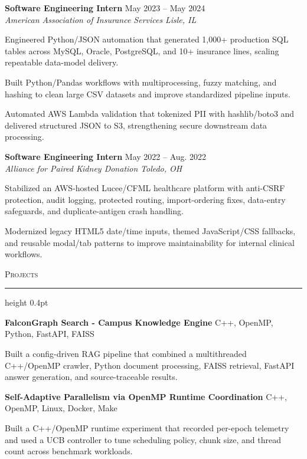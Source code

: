 \documentclass[letterpaper,11pt]{article}
\newcommand{\resumesection}[1]{%
  \par\vspace{2pt}%
  {\large\scshape #1}\par\vspace{2pt}%
  \hrule height 0.4pt\vspace{2pt}%
}
\newcommand{\resumeSubheading}[4]{
  \textbf{#1} \hfill #2\\
  \textit{#3} \hfill \textit{#4}
}
\newcommand{\projectHeading}[2]{
  \textbf{#1} \hfill #2
}
\begin{document}
\resumeSubheading
{Software Engineering Intern}{May 2023 -- May 2024}
{American Association of Insurance Services}{Lisle, IL}
\begin{tightitemize}
  \item Engineered Python/JSON automation that generated 1,000+ production SQL tables across MySQL, Oracle, PostgreSQL, and 10+ insurance lines, scaling repeatable data-model delivery.
  \item Built Python/Pandas workflows with multiprocessing, fuzzy matching, and hashing to clean large CSV datasets and improve standardized pipeline inputs.
  \item Automated AWS Lambda validation that tokenized PII with hashlib/boto3 and delivered structured JSON to S3, strengthening secure downstream data processing.
\end{tightitemize}

\resumeSubheading
{Software Engineering Intern}{May 2022 -- Aug. 2022}
{Alliance for Paired Kidney Donation}{Toledo, OH}
\begin{tightitemize}
  \item Stabilized an AWS-hosted Lucee/CFML healthcare platform with anti-CSRF protection, audit logging, protected routing, import-ordering fixes, data-entry safeguards, and duplicate-antigen crash handling.
  \item Modernized legacy HTML5 date/time inputs, themed JavaScript/CSS fallbacks, and reusable modal/tab patterns to improve maintainability for internal clinical workflows.
\end{tightitemize}

\resumesection{Projects}
\projectHeading{FalconGraph Search - Campus Knowledge Engine}{C++, OpenMP, Python, FastAPI, FAISS}
\begin{tightitemize}
  \item Built a config-driven RAG pipeline that combined a multithreaded C++/OpenMP crawler, Python document processing, FAISS retrieval, FastAPI answer generation, and source-traceable results.
\end{tightitemize}

\projectHeading{Self-Adaptive Parallelism via OpenMP Runtime Coordination}{C++, OpenMP, Linux, Docker, Make}
\begin{tightitemize}
  \item Built a C++/OpenMP runtime experiment that recorded per-epoch telemetry and used a UCB controller to tune scheduling policy, chunk size, and thread count across benchmark workloads.
\end{tightitemize}
\end{document}
